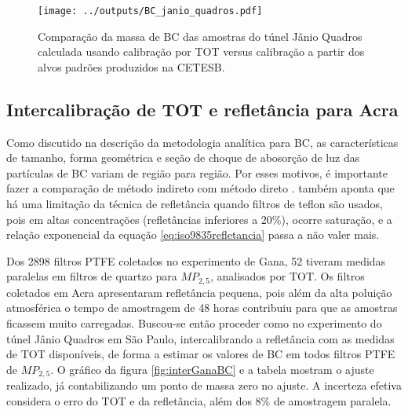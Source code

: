 \begin{figure}[H]
  \centering
  \begin{minipage}[b]{0.5\linewidth}
    \texttt{[image: ../outputs/BC\_janio\_quadros.pdf]}
    \caption{Comparação da massa de BC das amostras do túnel Jânio Quadros 
             calculada usando calibração por TOT versus calibração a partir dos 
             alvos padrões produzidos na CETESB. \label{fig:JQ}}
  \end{minipage}
  \hspace{0.5cm}
  \begin{minipage}[b]{0.45\linewidth}
    \begin{small}
      
    \end{small}
  \end{minipage}
\end{figure}

\newpage
\subsection{Intercalibração de TOT e refletância para Acra}

Como discutido na descrição da metodologia analítica para BC, as características
de tamanho, forma geométrica e seção de choque de abosorção de luz das 
partículas de BC variam de região para região.
Por esses motivos, é importante fazer a comparação de método indireto com método
direto \citep{quincey2007}. \citet{taha2007} também aponta que há uma limitação 
da técnica de refletância quando filtros de teflon são usados, pois em altas 
concentrações (refletâncias inferiores a 20\%), ocorre saturação, e a 
relação exponencial da equação \ref{eq:iso9835refletancia} passa a não valer 
mais. 

Dos 2898 filtros PTFE coletados no experimento de Gana, 52 tiveram medidas 
paralelas em filtros de quartzo para $MP_{2,5}$, analisados por TOT.
Os filtros coletados em Acra apresentaram refletância pequena, pois além da 
alta poluição atmosférica o tempo de amostragem de 48 horas contribuiu para que
as amostras ficassem muito carregadas. Buscou-se então proceder como no 
experimento do túnel Jânio Quadros em São Paulo, intercalibrando a refletância 
com as medidas de TOT disponíveis, de forma a estimar os valores de BC em todos 
filtros PTFE de $MP_{2,5}$. O gráfico da figura \ref{fig:interGanaBC} e a 
tabela \label{table:interGanaBC} mostram o ajuste realizado, já contabilizando 
um ponto de massa zero no ajuste. A incerteza efetiva considera o erro do TOT 
e da refletância, além dos 8\% de amostragem paralela. 

